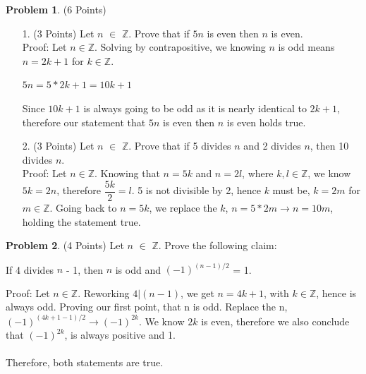 \documentclass[letterpaper, 12pt]{article}
\theoremstyle{definition}
\newtheorem{pb}{Problem} %
\begin{document}
\vspace{30mm}
\begin{pb} (6 Points)
\begin{enumerate}
    \item[1.] (3 Points) Let $n$ $\in$ $\mathbb{Z}$. Prove that if $5n$ is even then $n$ is even.\\

    Proof: Let $n \in \mathbb{Z}.$ Solving by contrapositive, we knowing $n$ is odd means $n = 2k + 1$ for  $k \in \mathbb{Z}$.
    \begin{center}
        $5n = 5 * 2k + 1 = 10k + 1$
    \end{center}
    Since $10k + 1$ is always going to be odd as it is nearly identical to $2k + 1$, therefore our statement that $5n$ is even then $n$ is even holds true.

    \vspace{5mm}
    \item[2.] (3 Points) Let $n$ $\in$ $\mathbb{Z}$. Prove that if 5 divides $n$ and 2 divides $n$, then 10 divides $n$.\\

    Proof: Let $n \in \mathbb{Z}$. Knowing that $n=5k$ and $n=2l$, where $k, l \in \mathbb{Z}$, we know $5k=2n$, therefore $\dfrac{5k}{2} = l$. 5 is not divisible by 2, hence $k$ must be, $k = 2m$ for $m \in \mathbb{Z}$. Going back to $n = 5k$, we replace the $k$, $n = 5 * 2m \rightarrow n = 10m$, holding the statement true.
 
\end{enumerate}
\end{pb}


\vspace{1cm} %
\setcounter{pb}{3}
\begin{pb} (4 Points) Let $n$ $\in$ $\mathbb{Z}$. Prove the following claim:
\begin{center}
If 4 divides $n$ - 1, then $n$ is odd and $(-1)^{(n-1)/2}$ = 1.
\end{center}
Proof: Let $n \in \mathbb{Z}$. Reworking $4 | (n-1)$, we get $n = 4k + 1$, with $k \in \mathbb{Z}$, hence is always odd. Proving our first point, that n is odd.
Replace the n, $(-1)^{(4k+1-1)/2} \rightarrow (-1)^{2k}$. We know $2k$ is even, therefore we also conclude that $(-1)^{2k}$, is always positive and 1. \\\\
Therefore, both statements are true.
\end{pb}
\end{document}
